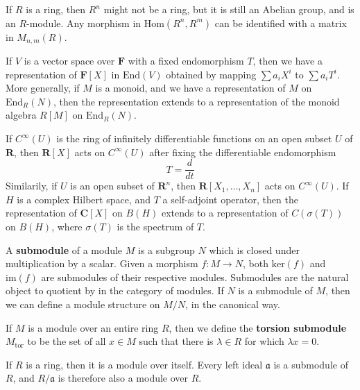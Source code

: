 \begin{example}
    If $R$ is a ring, then $R^n$ might not be a ring, but it is still an Abelian group, and is an $R$-module. Any morphism in $\text{Hom}(R^n, R^m)$ can be identified with a matrix in $M_{n,m}(R)$.
\end{example}

\begin{example}
    If $V$ is a vector space over $\mathbf{F}$ with a fixed endomorphism $T$, then we have a representation of $\mathbf{F}[X]$ in $\text{End}(V)$ obtained by mapping $\sum a_i X^i$ to $\sum a_i T^i$. More generally, if $M$ is a monoid, and we have a representation of $M$ on $\text{End}_R(N)$, then the representation extends to a representation of the monoid algebra $R[M]$ on $\text{End}_R(N)$.
\end{example}


\begin{example}
    If $C^\infty(U)$ is the ring of infinitely differentiable functions on an open subset $U$ of $\mathbf{R}$, then $\mathbf{R}[X]$ acts on $C^\infty(U)$ after fixing the differentiable endomorphism
    \[ T = \frac{d}{dt} \]
    Similarily, if $U$ is an open subset of $\mathbf{R}^n$, then $\mathbf{R}[X_1, \dots, X_n]$ acts on $C^\infty(U)$. If $H$ is a complex Hilbert space, and $T$ a self-adjoint operator, then the representation of $\mathbf{C}[X]$ on $B(H)$ extends to a representation of $C(\sigma(T))$ on $B(H)$, where $\sigma(T)$ is the spectrum of $T$.
\end{example}

A {\bf submodule} of a module $M$ is a subgroup $N$ which is closed under multiplication by a scalar. Given a morphism $f: M \to N$, both $\text{ker}(f)$ and $\text{im}(f)$ are submodules of their respective modules. Submodules are the natural object to quotient by in the category of modules. If $N$ is a submodule of $M$, then we can define a module structure on $M/N$, in the canonical way.

\begin{example}
    If $M$ is a module over an entire ring $R$, then we define the {\bf torsion submodule} $M_{\text{tor}}$ to be the set of all $x \in M$ such that there is $\lambda \in R$ for which $\lambda x = 0$.
\end{example}

\begin{example}
    If $R$ is a ring, then it is a module over itself. Every left ideal $\mathfrak{a}$ is a submodule of $R$, and $R/\mathfrak{a}$ is therefore also a module over $R$.
\end{example}


